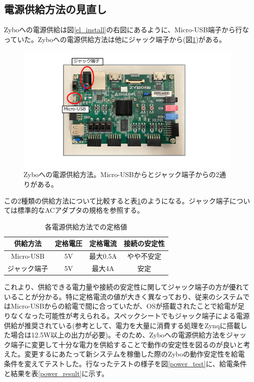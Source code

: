 \subsection{電源供給方法の見直し}
Zyboへの電源供給は図\ref{el_install}の右図にあるように、Micro-USB端子から行なっていた。Zyboへの電源供給方法は他にジャック端子から(図\ref{power_supply})がある。

\begin{figure}[htbp]
  \centering
  \includegraphics[width=0.5\columnwidth]{4_elDAQ/figs/connector_zybo2.pdf}
  \caption{Zyboへの電源供給方法。Micro-USBからとジャック端子からの2通りがある。}
  \label{power_supply}
\end{figure}

この2種類の供給方法について比較すると表\ref{power_spec}のようになる。ジャック端子については標準的なACアダプタの規格を参照する。

\begin{table}[htbp]
  \centering
  \caption{各電源供給方法での定格値}
  \vspace{3mm}
  \begin{tabular}{cccc} \hline
    供給方法 & 定格電圧 & 定格電流 & 接続の安定性  \\ \hline
    Micro-USB & 5V & 最大0.5A & やや不安定\\
    ジャック端子 & 5V & 最大4A &  安定\\ \hline
  \end{tabular}
  \label{power_spec}
\end{table}

これより、供給できる電力量や接続の安定性に関してジャック端子の方が優れていることが分かる。特に定格電流の値が大きく異なっており、従来のシステムではMicro-USBからの給電で間に合っていたが、OSが搭載されたことで給電が足りなくなった可能性が考えられる。スペックシート\cite{power_ref}でもジャック端子による電源供給が推奨されている(参考として、電力を大量に消費する処理をZynqに搭載した場合は12.5W以上の出力が必要)。そのため、Zyboへの電源供給方法をジャック端子に変更して十分な電力を供給することで動作の安定性を図るのが良いと考えた。変更するにあたって新システムを稼働した際のZyboの動作安定性を給電条件を変えてテストした。行なったテストの様子を図\ref{power_test}に、給電条件と結果を表\ref{power_result}に示す。

